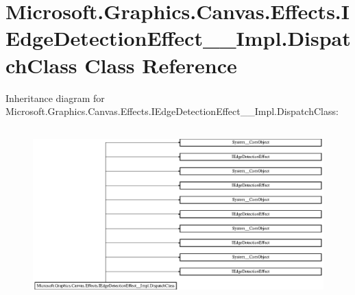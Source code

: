 \hypertarget{class_microsoft_1_1_graphics_1_1_canvas_1_1_effects_1_1_i_edge_detection_effect_____impl_1_1_dispatch_class}{}\section{Microsoft.\+Graphics.\+Canvas.\+Effects.\+I\+Edge\+Detection\+Effect\+\_\+\+\_\+\+Impl.\+Dispatch\+Class Class Reference}
\label{class_microsoft_1_1_graphics_1_1_canvas_1_1_effects_1_1_i_edge_detection_effect_____impl_1_1_dispatch_class}
Inheritance diagram for Microsoft.\+Graphics.\+Canvas.\+Effects.\+I\+Edge\+Detection\+Effect\+\_\+\+\_\+\+Impl.\+Dispatch\+Class\+:\begin{figure}[H]
\begin{center}
\leavevmode
\includegraphics[height=6.695652cm]{class_microsoft_1_1_graphics_1_1_canvas_1_1_effects_1_1_i_edge_detection_effect_____impl_1_1_dispatch_class}
\end{center}
\end{figure}
